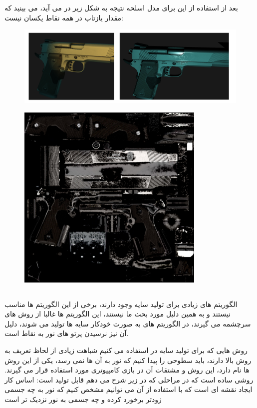\documentclass[a4paper, 12pt]{book}
\begin{document}
      بعد از استفاده از این  برای مدل اسلحه نتیجه به شکل زیر در می آید، می بینید که مقدار یازتاب در همه نقاط یکسان نیست:

\begin{figure}[ht]
    \centering
    \href{https://github.com/devprofile98/shm}{
        \includegraphics[width=15cm]{images/specular-gun.png}
    }
    \caption{}
    \label{fig:my_label}
\end{figure}

\begin{figure}[H]
    \centering
    \href{https://github.com/devprofile98/shm}{
        \includegraphics[width=9cm]{images/handgun-S.jpg}
    }
    \caption{}
    \label{fig:my_label}
\end{figure}

\newpage

\subsection*{}
    الگوریتم های زیادی برای تولید سایه وجود دارند، برخی از این الگوریتم ها مناسب  نیستند و به همین دلیل مورد بحث ما نیستند، این الگوریتم ها غالبا از روش های  سرچشمه می گیرند، در الگوریتم های  به صورت خودکار سایه ها تولید می شوند، دلیل آن نیز نرسیدن پرتو های نور به نقاط است.\par
    روش هایی که برای تولید سایه در  استفاده می کنیم شباهت زیادی از لحاظ تعریف به روش بالا دارند، باید سطوحی را پیدا کنیم که نور به آن ها نمی رسد، یکی از این روش ها  نام دارد، این روش و مشتقات آن در بازی کامپیوتری مورد استفاده قرار می گیرند.  روشی ساده است که در مراحلی که در زیر شرح می دهم قابل تولید است: اساس کار ایجاد نقشه ای است که با استفاده از آن می توانیم مشخص کنیم که نور به چه جسمی زودتر برخورد کرده و چه جسمی به نور نزدیک تر است
\end{document}
